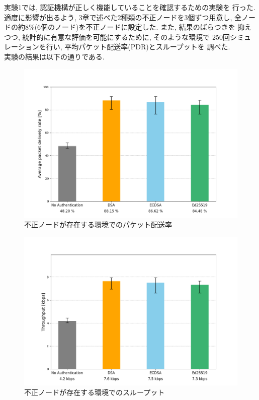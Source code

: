 実験1では, 認証機構が正しく機能していることを確認するための実験を
行った. 適度に影響が出るよう, 3章で述べた2種類の不正ノードを3個ずつ用意し, 
全ノードの約8\%(6個のノード)を不正ノードに設定した. また, 結果のばらつきを
抑えつつ, 統計的に有意な評価を可能にするために, そのような環境で
250回シミュレーションを行い, 平均パケット配送率(PDR)とスループットを
調べた. \\
\indent 実験の結果は以下の通りである. \\

\begin{figure}
  \centering
  \includegraphics[width=1\textwidth]{figures/exp1_pdr.png}
  \caption{不正ノードが存在する環境でのパケット配送率}
  \label{fig:exp1_pdr}
\end{figure}

\begin{figure}
  \centering
  \includegraphics[width=1\textwidth]{figures/exp1_throughput.png}
  \caption{不正ノードが存在する環境でのスループット}
  \label{fig:exp1_throughput}
\end{figure}


